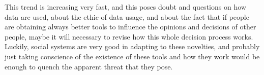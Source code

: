 \documentclass[11pt,a4paper,twocolumn]{article}
\begin{document}
This trend is increasing very fast, and this poses doubt and questions on how data are used, about the ethic of data usage, and about the fact that if people are obtaining always better tools to influence the opinions and decisions of other people, maybe it will necessary to revise how this whole decision process works.
Luckily, social systems are very good in adapting to these novelties, and probably just taking conscience of the existence of these tools and how they work would be enough to quench the apparent threat that they pose. 


\end{document}
